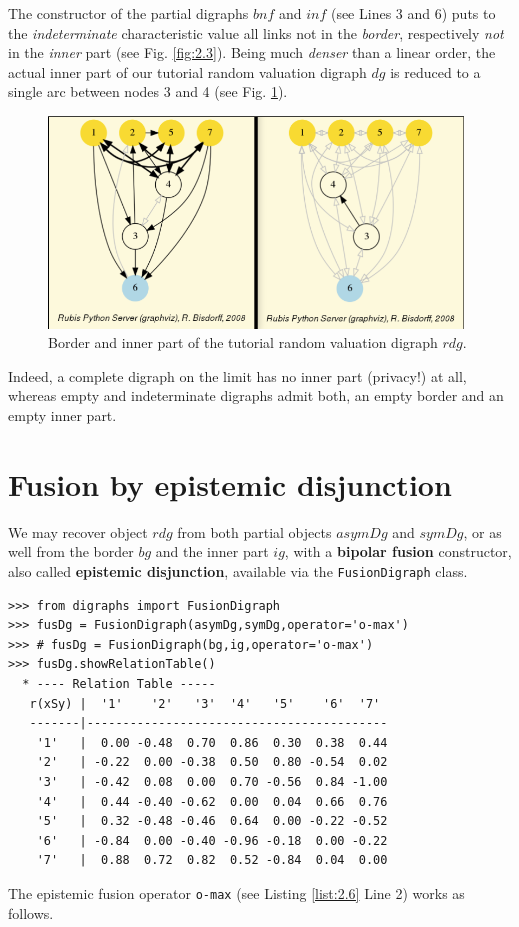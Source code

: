 The constructor of the partial digraphs $bnf$ and $inf$  (see Lines 3 and 6) puts to the \emph{indeterminate} characteristic value all links not in the \emph{border}, respectively \emph{not} in the \emph{inner} part (see Fig. \ref{fig:2.3}). Being much {\em denser\/} than a linear order, the actual inner part of our tutorial random valuation digraph $dg$ is reduced to a single arc between nodes 3 and 4 (see Fig. \ref{fig:2.4}).
\begin{figure}[h]
\includegraphics[width=11cm]{Figures/graphBorderAndInner.png}
\caption{Border and inner part of the tutorial random valuation digraph $rdg$.}
\label{fig:2.4}       %
\end{figure}
Indeed, a complete digraph on the limit has no inner part (privacy!) at all, whereas empty and indeterminate digraphs admit both, an empty border and an empty inner part.

\section{Fusion by epistemic disjunction}
\label{sec:2.5}

We may recover object $rdg$ from both partial objects $asymDg$ and $symDg$, or as well from the border $bg$ and the inner part $ig$, with a \textbf{bipolar fusion} constructor, also called \textbf{epistemic disjunction}, available via the \texttt{FusionDigraph} class. 
\begin{lstlisting}[caption={Epistemic fusion of partial diagraphs},label=list:2.6]
>>> from digraphs import FusionDigraph
>>> fusDg = FusionDigraph(asymDg,symDg,operator='o-max')
>>> # fusDg = FusionDigraph(bg,ig,operator='o-max')
>>> fusDg.showRelationTable()
  * ---- Relation Table -----
   r(xSy) |  '1'    '2'   '3'  '4'   '5'    '6'  '7'	  
   -------|------------------------------------------
    '1'   |  0.00 -0.48  0.70  0.86  0.30  0.38  0.44	 
    '2'   | -0.22  0.00 -0.38  0.50  0.80 -0.54  0.02	 
    '3'   | -0.42  0.08  0.00  0.70 -0.56  0.84 -1.00	 
    '4'   |  0.44 -0.40 -0.62  0.00  0.04  0.66  0.76	 
    '5'   |  0.32 -0.48 -0.46  0.64  0.00 -0.22 -0.52	 
    '6'   | -0.84  0.00 -0.40 -0.96 -0.18  0.00 -0.22	 
    '7'   |  0.88  0.72  0.82  0.52 -0.84  0.04  0.00
\end{lstlisting}
The epistemic fusion operator \texttt{o-max} (see Listing \ref{list:2.6} Line 2) works as follows.

